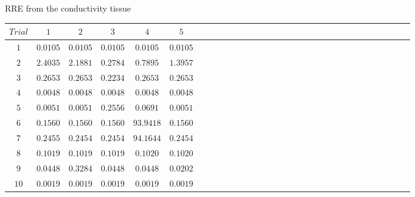 \documentclass[t,12pt,english
\ifx\beamermode\undefined\else,\beamermode\fi
]{beamer}
\begin{document}
\begin{frame}{RRE from the conductivity tissue}
 
\begin{table}[!htbp]
\tiny
\centering
\begin{tabular}{c c c c c c c c c c c c c c c c c c c c c c c c c c c c c c c } 
   \hline 
$Trial$&$1$&$2$&$3$&$4$&$5$\\
   \hline 
$1$&$ 0.0105$&$ 0.0105$&$ 0.0105$&$ 0.0105$&$ 0.0105$\\
$2$&$ 2.4035$&$ 2.1881$&$ 0.2784$&$ 0.7895$&$ 1.3957$\\
$3$&$ 0.2653$&$ 0.2653$&$ 0.2234$&$ 0.2653$&$ 0.2653$\\
$4$&$ 0.0048$&$ 0.0048$&$ 0.0048$&$ 0.0048$&$ 0.0048$\\
$5$&$ 0.0051$&$ 0.0051$&$ 0.2556$&$ 0.0691$&$ 0.0051$\\
$6$&$ 0.1560$&$ 0.1560$&$ 0.1560$&$93.9418$&$ 0.1560$\\
$7$&$ 0.2455$&$ 0.2454$&$ 0.2454$&$94.1644$&$ 0.2454$\\
$8$&$ 0.1019$&$ 0.1019$&$ 0.1019$&$ 0.1020$&$ 0.1020$\\
$9$&$ 0.0448$&$ 0.3284$&$ 0.0448$&$ 0.0448$&$ 0.0202$\\
$10$&$ 0.0019$&$ 0.0019$&$ 0.0019$&$ 0.0019$&$ 0.0019$\\
 \hline 

\end{tabular}
\end{table}
 

    
\end{frame}
\end{document}

